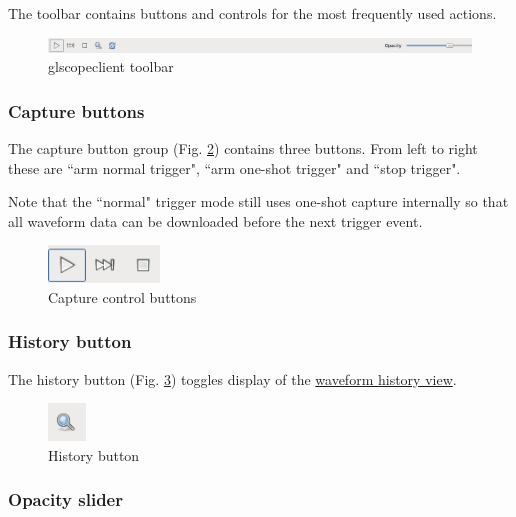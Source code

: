 \documentclass[11pt]{article}
\begin{document}
The toolbar contains buttons and controls for the most frequently used actions.

\begin{figure}[h]
\centering
\includegraphics[width=16cm]{images/toolbar.png}
\caption{glscopeclient toolbar}
\label{toolbar}
\end{figure}

\subsubsection{Capture buttons}

The capture button group (Fig. \ref{capturebuttons}) contains three buttons. From left to right these are ``arm
normal trigger", ``arm one-shot trigger" and ``stop trigger".

Note that the ``normal" trigger mode still uses one-shot capture internally so that all waveform data can be downloaded
before the next trigger event.

\begin{figure}[h]
\centering
\includegraphics[height=1cm]{images/capture-icons.png}
\caption{Capture control buttons}
\label{capturebuttons}
\end{figure}

\subsubsection{History button}

The history button (Fig. \ref{historybutton}) toggles display of the \hyperref[sec:history]{waveform history view}.

\begin{figure}[h]
\centering
\includegraphics[height=1cm]{images/history-button.png}
\caption{History button}
\label{historybutton}
\end{figure}

\subsubsection{Opacity slider}
\end{document}
